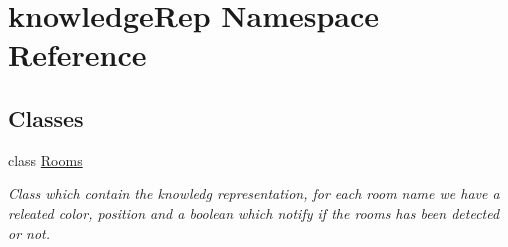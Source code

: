 \hypertarget{namespaceknowledgeRep}{}\section{knowledge\+Rep Namespace Reference}
\label{namespaceknowledgeRep}
\subsection*{Classes}
\begin{DoxyCompactItemize}
\item 
class \hyperlink{classknowledgeRep_1_1Rooms}{Rooms}
\begin{DoxyCompactList}\small\item\em Class which contain the knowledg representation, for each room name we have a releated color, position and a boolean which notify if the rooms has been detected or not. \end{DoxyCompactList}\end{DoxyCompactItemize}
